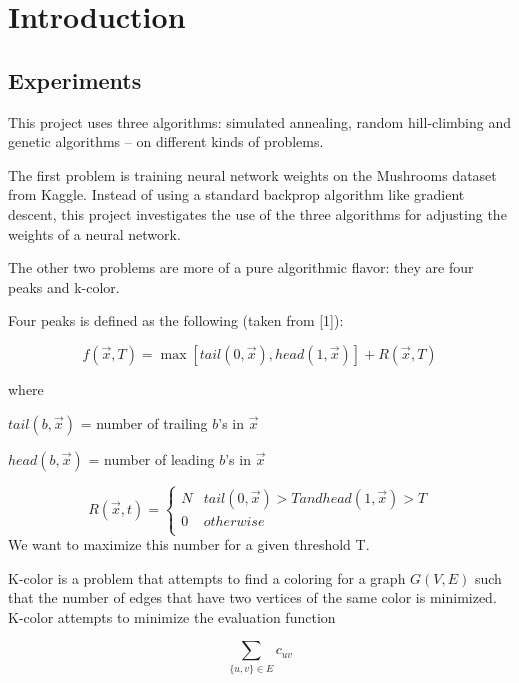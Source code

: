 \documentclass[11pt]{article}
\begin{document}
        \section{Introduction}
            \subsection{Experiments}
            This project uses three algorithms: simulated annealing, random hill-climbing and genetic algorithms -- on different
            kinds of problems.

            The first problem is training neural network weights on the Mushrooms dataset from Kaggle. Instead of using a standard
            backprop algorithm like gradient descent, this project investigates the use of the three algorithms for adjusting
            the weights of a neural network.

            The other two problems are more of a pure algorithmic flavor: they are four peaks and k-color.

            Four peaks is defined as the following (taken from [1]):

            \[
                f(\vec{x}, T) = \max \left[ tail(0, \vec{x}), head(1, \vec{x})\right] + R(\vec{x}, T)
            \]    

            where

            $tail(b, \vec{x})$ = number of trailing $b$'s in $\vec{x}$

            $head(b, \vec{x})$ = number of leading $b$'s in $\vec{x}$
                
            \[
                R(\vec{x}, t) = 
                \begin{cases} 
                        N & tail(0, \vec{x}) > T and head(1, \vec{x}) > T \\
                        0 & otherwise \\
                     \end{cases}  
            \]
            We want to maximize this number for a given threshold T.

            K-color is a problem that attempts to find a coloring for
            a graph $G(V, E)$ such that the number of edges that have
            two vertices of the same color is minimized. K-color
            attempts to minimize the evaluation function

            \[
                 \sum_{\{u, v\} \in E} c_{uv}
            \]
\end{document}

